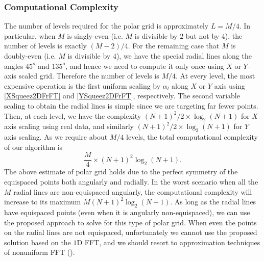 \documentclass{UCF_ETD}
\begin{document}
 \subsubsection{Computational Complexity}
 The number of levels required for the polar grid is approximately
  $L = M/4$. In particular, when $M$ is singly-even
 (i.e. $M$ is divisible by $2$ but not by $4$),   the number of levels is exactly $(M-2)/4$. For the remaining case that  $M$ is doubly-even (i.e. $M$ is divisible by $4$), we have the special radial lines along the angles $45^o$ and $135^o$, and  hence we need to compute it only once using $X$ or $Y$-axis scaled grid. Therefore the number of levels is $M/4$. At every level, the most expensive operation is the first uniform scaling by $\alpha_l$ along $X$ or $Y$ axis using \eqref{XSqueez2DFrFT} and \eqref{YSqueez2DFrFT}, respectively. The second variable scaling to obtain the radial lines is simple since we are targeting far fewer points. Then, at each level, we have  the complexity $(N+1)^2/2 \times \log_2(N+1)$ for $X$ axis scaling using real data,
 and similarly $(N+1)^2/2 \times \log_2(N+1)$ for $Y$ axis scaling.
 As we require about %
  $M/4$ levels, the total computational complexity of our algorithm is
 \begin{equation}\label{2DComplexity}
 \frac{M}{4}\times (N+1)^2 \log_2(N+1).
 \end{equation}
 The above estimate of polar grid holds due to the perfect symmetry of the equispaced points both angularly and radially. In the worst scenario when all the $M$ radial lines are non-equispaced  angularly, the computational complexity will increase to its maximum $M(N+1)^2\log_2(N+1)$. As long as the radial lines have equispaced points (even when it is angularly non-equispaced), we can use the proposed approach to solve for this type of polar grid.  When even the points on the radial lines are not equispaced, unfortunately we cannot use the proposed  solution based on the $1$D FFT, and we should resort to approximation techniques of nonuniform FFT (\cite{Markus2007}).
 
 
\end{document}
